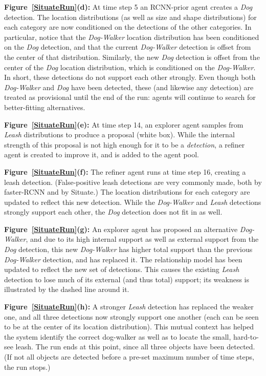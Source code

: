 \documentclass[conference]{IEEEtran}
\begin{document}
{\bf Figure~\ref{SituateRun}(d):} At time step 5 an RCNN-prior agent
creates a {\it Dog} detection.  The location distributions (as
well as size and shape distributions) for each category are now
conditioned on the detections of the other categories.   In particular, notice
that the {\it Dog-Walker} location distribution has been conditioned
on the {\it Dog} detection, and that the current {\it Dog-Walker}
detection is offset from the center of that distribution.  Similarly,
the new {\it Dog} detection is offset from the center of the {\it Dog}
location distribution, which is conditioned on the {\it Dog-Walker}.
In short, these detections do not support each other strongly.  Even
though both {\it Dog-Walker} and {\it Dog} have been detected, these
(and likewise any detection) are treated as provisional until the end
of the run: agents will continue to search for better-fitting
alternatives.

{\bf Figure~\ref{SituateRun}(e):} At time step 14, an explorer
agent samples from {\it Leash} distributions to produce a proposal
(white box).  While the internal strength of this proposal is not high
enough for it to be a {\it detection}, a refiner agent is created to
improve it, and is added to the agent pool. 

{\bf Figure~\ref{SituateRun}(f):} The refiner agent runs at
time step 16, creating a leash detection.  (False-positive leash
detections are very commonly made, both by faster-RCNN and by
Situate.)  The location distributions for each category are updated to
reflect this new detection.  While the {\it Dog-Walker} and {\it
  Leash} detections strongly support each other, the {\it Dog}
detection does not fit in as well.

{\bf Figure~\ref{SituateRun}(g):} An explorer agent has proposed an
alternative {\it Dog-Walker}, and due to its high internal support as
well as external support from the {\it Dog} detection, this new {\it
  Dog-Walker} has higher total support than the previous {\it
  Dog-Walker} detection, and has replaced it.  The relationship model
has been updated to reflect the new set of detections.  This causes
the existing {\it Leash} detection to lose much of its external (and
thus total) support; its weakness is illustrated by the dashed line
around it.

{\bf Figure~\ref{SituateRun}(h):} A stronger {\it Leash} detection has
replaced the weaker one, and all three detections now strongly support one another
(each can be seen to be at the center of its location distribution).
This mutual context has helped the system identify the correct
dog-walker as well as to locate the small, hard-to-see leash.  The run
ends at this point, since all three objects have been detected.  (If
not all objects are detected before a pre-set maximum
number of time steps, the run stops.)
\end{document}
